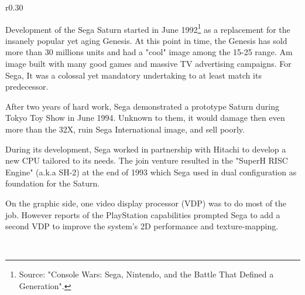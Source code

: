 \begin{wrapfigure}[10]{r}{0.30\textwidth}{
\centering {}}
\end{wrapfigure}
Development of the Sega Saturn started in June 1992\footnote{Source: "Console Wars: Sega, Nintendo, and the Battle That Defined a Generation".} as a replacement for the insanely popular yet aging Genesis. At this point in time, the Genesis has sold more than 30 millions units and had a "cool" image among the 15-25 range. Am image built with many good games and massive TV advertising campaigns. For Sega, It was a colossal yet mandatory undertaking to at least match its predecessor.\\
\par
After two years of hard work, Sega demonstrated a prototype Saturn during Tokyo Toy Show in June 1994. Unknown to them, it would damage then even more than the 32X, ruin Sega International image, and sell poorly.\\
\par
During its development, Sega worked in partnership with Hitachi to develop a new CPU tailored to its needs. The join venture resulted in the "SuperH RISC Engine" (a.k.a SH-2) at the end of 1993 which Sega used in dual configuration as foundation for the Saturn.\\
\par
 On the graphic side, one video display processor (VDP) was to do most of the job. However reports of the PlayStation capabilities prompted Sega to add a second VDP to improve the system's 2D performance and texture-mapping.\\
\par
{}\\

